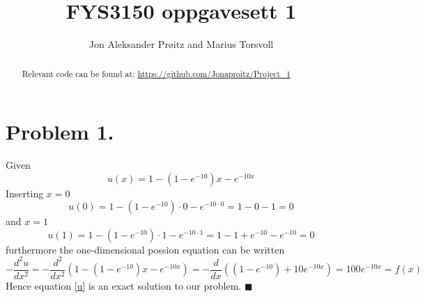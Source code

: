 \documentclass[english,notitlepage]{revtex4-1}  %
\begin{document}
\title{FYS3150 oppgavesett 1}

\author{Jon Aleksander Prøitz and Marius Torsvoll}


\begin{abstract}
\noindent Relevant code can be found at:
\url{https://github.com/Jonaproitz/Project_1}
\end{abstract}

\noaffiliation

\maketitle


\section*{Problem 1.}
    \label{sec:oppgave1}
    Given
    \begin{equation}
            u(x) 
        =   1-(1-e^{-10})x - e^{-10x}
        \label{u}
    \end{equation}
    Inserting $x = 0$ 
    \begin{equation*}
            u(0)
        =   1 - (1 - e^{-10}) \cdot 0 - e^{-10 \cdot 0}
        =   1 - 0 - 1
        =   0
    \end{equation*}
    and $x = 1$
    \begin{equation*}
            u(1)
        =   1 - (1 - e^{-10}) \cdot 1 - e^{-10 \cdot 1}
        =   1 - 1 + e^{-10} - e^{-10}
        =   0
    \end{equation*}
    furthermore the one-dimensional possion equation can be written
    \begin{equation*}
            -\frac{d^2 u}{d x^2} 
        =   -\frac{d^2}{d x^2}\left(1-(1-e^{-10})x - e^{-10x}\right)
        =   -\frac{d}{d x}\left((1-e^{-10}) + 10e^{-10x} \right) 
        =   100e^{-10x}
        =   f(x)
    \end{equation*}
    Hence equation \ref{u} is an exact solution to our problem.
    \hfill$\blacksquare$
\end{document}
